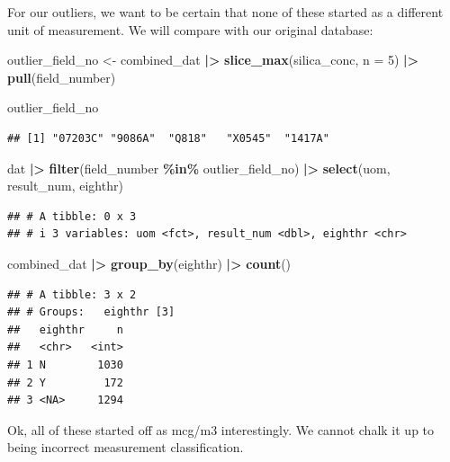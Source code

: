\documentclass[
]{article}
\newenvironment{Shaded}{\begin{snugshade}}{\end{snugshade}}
\newcommand{\AttributeTok}[1]{\textcolor[rgb]{0.13,0.29,0.53}{#1}}
\newcommand{\DecValTok}[1]{\textcolor[rgb]{0.00,0.00,0.81}{#1}}
\newcommand{\FunctionTok}[1]{\textcolor[rgb]{0.13,0.29,0.53}{\textbf{#1}}}
\newcommand{\NormalTok}[1]{#1}
\newcommand{\OtherTok}[1]{\textcolor[rgb]{0.56,0.35,0.01}{#1}}
\newcommand{\SpecialCharTok}[1]{\textcolor[rgb]{0.81,0.36,0.00}{\textbf{#1}}}
\begin{document}
For our outliers, we want to be certain that none of these started as a
different unit of measurement. We will compare with our original
database:

\begin{Shaded}
\begin{Highlighting}[]
\NormalTok{outlier\_field\_no }\OtherTok{\textless{}{-}}\NormalTok{ combined\_dat }\SpecialCharTok{|\textgreater{}} 
  \FunctionTok{slice\_max}\NormalTok{(silica\_conc, }\AttributeTok{n =} \DecValTok{5}\NormalTok{) }\SpecialCharTok{|\textgreater{}} 
  \FunctionTok{pull}\NormalTok{(field\_number)  }

\NormalTok{outlier\_field\_no }
\end{Highlighting}
\end{Shaded}

\begin{verbatim}
## [1] "07203C" "9086A"  "Q818"   "X0545"  "1417A"
\end{verbatim}

\begin{Shaded}
\begin{Highlighting}[]
\NormalTok{dat }\SpecialCharTok{|\textgreater{}} 
  \FunctionTok{filter}\NormalTok{(field\_number }\SpecialCharTok{\%in\%}\NormalTok{ outlier\_field\_no) }\SpecialCharTok{|\textgreater{}} 
  \FunctionTok{select}\NormalTok{(uom, result\_num, eighthr) }
\end{Highlighting}
\end{Shaded}

\begin{verbatim}
## # A tibble: 0 x 3
## # i 3 variables: uom <fct>, result_num <dbl>, eighthr <chr>
\end{verbatim}

\begin{Shaded}
\begin{Highlighting}[]
\NormalTok{combined\_dat }\SpecialCharTok{|\textgreater{}} 
  \FunctionTok{group\_by}\NormalTok{(eighthr) }\SpecialCharTok{|\textgreater{}} 
  \FunctionTok{count}\NormalTok{() }
\end{Highlighting}
\end{Shaded}

\begin{verbatim}
## # A tibble: 3 x 2
## # Groups:   eighthr [3]
##   eighthr     n
##   <chr>   <int>
## 1 N        1030
## 2 Y         172
## 3 <NA>     1294
\end{verbatim}

Ok, all of these started off as mcg/m3 interestingly. We cannot chalk it
up to being incorrect measurement classification.
\end{document}
